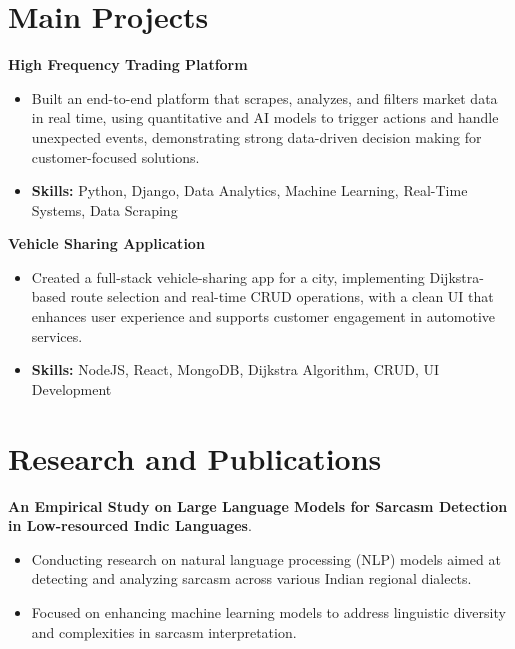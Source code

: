 \documentclass[a4paper,11pt]{article}
\begin{document}
\section{\textbf{Main Projects}}

\vspace{1mm}
  \textbf{High Frequency Trading Platform  }
\vspace{-1.5mm} %
\begin{itemize}
  \item Built an end-to-end platform that scrapes, analyzes, and filters market data in real time, using quantitative and AI models to trigger actions and handle unexpected events, demonstrating strong data-driven decision making for customer-focused solutions.
\vspace{-3mm}
  \item \textbf{Skills:} Python, Django, Data Analytics, Machine Learning, Real-Time Systems, Data Scraping
\end{itemize}


\vspace{1mm}
   \textbf{Vehicle Sharing Application }
\vspace{-1.5mm} %
\begin{itemize}
  \item Created a full-stack vehicle-sharing app for a city, implementing Dijkstra-based route selection and real-time CRUD operations, with a clean UI that enhances user experience and supports customer engagement in automotive services.
\vspace{-3mm}
  \item \textbf{Skills:} NodeJS, React, MongoDB, Dijkstra Algorithm, CRUD, UI Development
\end{itemize}



\section{\textbf{Research and Publications} \hfill }
\vspace{1mm}
  \textbf{An Empirical Study on Large Language Models for Sarcasm Detection in Low-resourced Indic Languages}.
\vspace{-1mm} %
\begin{itemize}
  \item Conducting research on natural language processing (NLP) models aimed at detecting and analyzing sarcasm across various Indian regional dialects.
\vspace{-3mm}
  \item Focused on enhancing machine learning models to address linguistic diversity and complexities in sarcasm interpretation.
\end{itemize}
\end{document}
